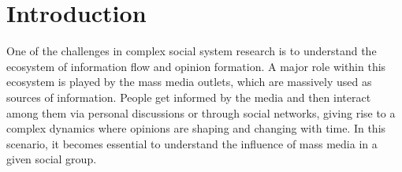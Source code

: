 \documentclass{bmcart}
\begin{document}



\section*{Introduction}


\par One of the challenges in  complex social system research is to understand the ecosystem of information flow and opinion formation. 
A major role within this ecosystem is played by the mass media outlets, which are massively used as sources of information.
People get informed by the media and then interact among them via personal discussions or through social networks, giving rise to a complex dynamics where opinions are shaping and changing with time. 
In this scenario, it becomes essential to understand the influence of mass media in a given social group.
\end{document}
